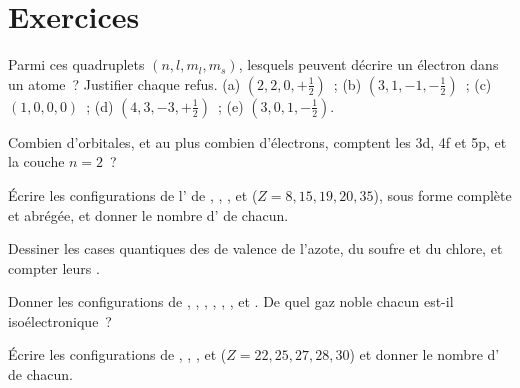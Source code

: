 \section{Exercices}

\begin{exercise}[$\star$]\label{exo:b1:quantum-numbers:1}
Parmi ces quadruplets $(n, l, m_l, m_s)$, lesquels peuvent décrire un
électron dans un atome~? Justifier chaque refus.
(a) $(2, 2, 0, +\tfrac12)$~; (b) $(3, 1, -1, -\tfrac12)$~;
(c) $(1, 0, 0, 0)$~; (d) $(4, 3, -3, +\tfrac12)$~; (e) $(3, 0, 1, -\tfrac12)$.
\end{exercise}

\begin{exercise}[$\star$]\label{exo:b1:quantum-numbers:2}
Combien d'orbitales, et au plus combien d'électrons, comptent les
 3d, 4f et 5p, et la couche $n = 2$~?
\end{exercise}

\begin{exercise}[$\star$]\label{exo:b1:quantum-numbers:3}
Écrire les configurations de l' de , ,
,  et  ($Z = 8, 15, 19, 20, 35$), sous forme
complète et abrégée, et donner le nombre d' de
chacun.
\end{exercise}

\begin{exercise}[$\star$]\label{exo:b1:quantum-numbers:4}
Dessiner les cases quantiques des  de valence de l'azote, du
soufre et du chlore, et compter leurs .
\end{exercise}

\begin{exercise}[$\star\star$]\label{exo:b1:quantum-numbers:5}
Donner les configurations de , , ,
, , ,  et . De quel gaz
noble chacun est-il isoélectronique~?
\end{exercise}

\begin{exercise}[$\star\star$]\label{exo:b1:quantum-numbers:6}
Écrire les configurations de , , ,
 et  ($Z = 22, 25, 27, 28, 30$) et donner le
nombre d' de chacun.
\end{exercise}


